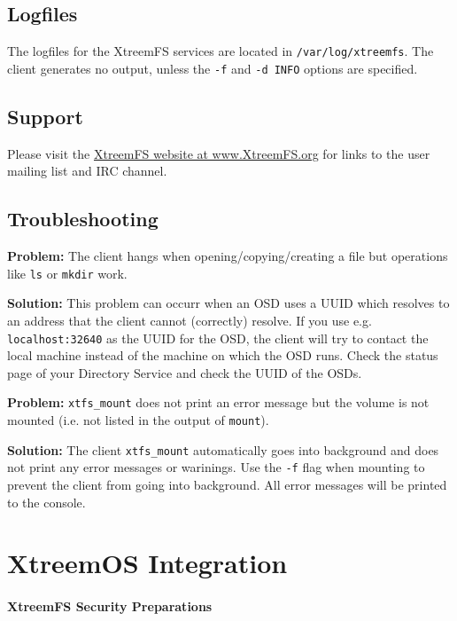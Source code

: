 \documentclass[a4paper,10pt]{book}
\begin{document}
\section{Logfiles}

The logfiles for the XtreemFS services are located in \texttt{/var/log/xtreemfs}. The client generates no output, unless the \texttt{-f} and \texttt{-d INFO} options are specified.

\section{Support}
Please visit the \href{http://www.XtreemFS.org}{XtreemFS website at www.XtreemFS.org} for links to the user mailing list and IRC channel.

\section{Troubleshooting}

\textbf{Problem: }The client hangs when opening/copying/creating a file but operations like \texttt{ls} or \texttt{mkdir} work.

\textbf{Solution: }This problem can occurr when an OSD uses a UUID which resolves to an address that the client cannot (correctly) resolve. If you use e.g. \texttt{localhost:32640} as the UUID for the OSD, the client will try to contact the local machine instead of the machine on which the OSD runs. Check the status page of your Directory Service and check the UUID of the OSDs.

\textbf{Problem: } \texttt{xtfs\_mount} does not print an error message but the volume is not mounted (i.e. not listed in the output of \texttt{mount}).

\textbf{Solution: } The client \texttt{xtfs\_mount} automatically goes into background and does not print any error messages or warinings. Use the \texttt{-f} flag when mounting to prevent the client from going into background. All error messages will be printed to the console.

\appendix

\chapter{XtreemOS Integration}

\subsubsection{XtreemFS Security Preparations}
\label{installconf-xfs-security}
\end{document}
